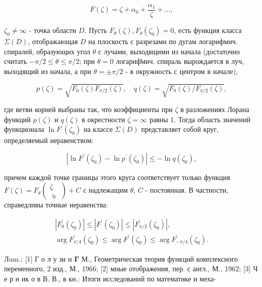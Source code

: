 \documentclass[10pt]{article}
\begin{document}
\[

F(\zeta)=\zeta+\alpha_{0}+\frac{\alpha_{1}}{\zeta}+\ldots,

\]



$\zeta_{0} \neq \infty$ - точка области $D$. Пусть $F_{\theta}(\zeta), F_{\theta}\left(\zeta_{0}\right)=0$, есть функция класса $\Sigma(D)$, отображающая $D$ на плоскость с разрезами по дугам логарифмич. спиралей, образующих угол $\theta$ с лучами, выходящими из начала (достаточно считать $-\pi / 2 \leqslant \theta \leqslant \pi / 2$; при $\theta=0$ логариф̆мич. спираль вырождается в луч, выходящий из начала, а при $\theta= \pm \pi / 2$ - в окружность с центром в начале),



\[

p(\zeta)=\sqrt{F_{0}(\zeta) F_{\pi / 2}(\zeta)}, \quad q(\zeta)=\sqrt{F_{0}(\zeta) / F_{\pi / 2}(\zeta)},

\]



где ветви корней выбраны так, что коэффициенты при $\zeta$ в разложениях Лорана функций $p(\zeta)$ и $q(\zeta)$ в окрестности $\zeta=\infty$ равны 1. Тогда область значений функционала $\ln F^{\prime}\left(\zeta_{0}\right)$ на классе $\Sigma(D)$ представляет собой круг, определяемый неравенством:



\[

\left|\ln F^{\prime}\left(\zeta_{0}\right)-\ln p^{\prime}\left(\zeta_{0}\right)\right| \leqslant-\ln q\left(\zeta_{0}\right),

\]



причем каждой точке границы этого круга соответствует только функция $F(\zeta)=F_{\theta}\left(\begin{array}{l}\zeta \\ \text { ๖ }\end{array}\right)+C$ с надлежащим $\theta$, $C$ - постоянная. В частности, справедливы точные неравенства:



\[

\begin{gathered}

\left|F_{0}^{\prime}\left(\zeta_{0}\right)\right| \leqslant\left|F^{\prime}\left(\zeta_{0}\right)\right| \leqslant\left|F_{\pi / 2}^{\prime}\left(\zeta_{0}\right)\right|, \\

\arg F_{\pi / 4}^{\prime}\left(\zeta_{0}\right) \leqslant \arg F^{\prime}\left(\zeta_{0}\right) \leqslant \arg F_{-\pi / 4}^{\prime}\left(\zeta_{0}\right) .

\end{gathered}

\]



Лum.: [1] Г о л у зи н $\boldsymbol{\Gamma}$ М., Геометрическая теория функций комплексного переменного, 2 изд., М., 1966; [2] мные отображения, пер. с англ., М., 1962; [3] Ч е р н ик о в В. В., в кн.: Итоги исследований по математике и меха-
\end{document}
